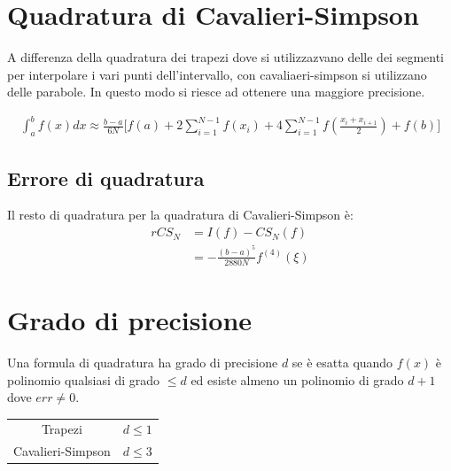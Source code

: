 \section{Quadratura di Cavalieri-Simpson}

A differenza della quadratura dei trapezi dove si utilizzazvano delle dei segmenti per interpolare i vari punti dell'intervallo,
con cavaliaeri-simpson si utilizzano delle parabole. In questo modo si riesce ad ottenere una maggiore precisione.

\begin{align}
  \int_a^b f(x) dx \approx \frac{b - a}{6N} \Bigg[ f(a) + 2 \sum_{i=1}^{N-1} f(x_i) + 4 \sum_{i=1}^{N-1} f(\frac{x_i + x_{i+1}}{2}) + f(b) \Bigg]
\end{align}

\subsection{Errore di quadratura}
Il resto di quadratura per la quadratura di Cavalieri-Simpson è:
\begin{align}
  r{CS_N} &= I(f) - CS_N(f) \\
  &= - \frac{(b - a)^5}{2880N} f^{(4)}(\xi)
\end{align}



\section{Grado di precisione}
Una formula di quadratura ha grado di precisione $d$ se \`e esatta quando $f(x)$ \`e polinomio qualsiasi di grado $\leq d$ 
ed esiste almeno un polinomio di grado $d+1$ dove $err\neq 0$.


\begin{center}
  \begin{tabular}{| c | c |}
    \hline
    Trapezi & $d \leq 1$ \\
    Cavalieri-Simpson & $d \leq 3$ \\
    \hline
  \end{tabular}
\end{center}

\renewcommand{\arraystretch}{1.4}


